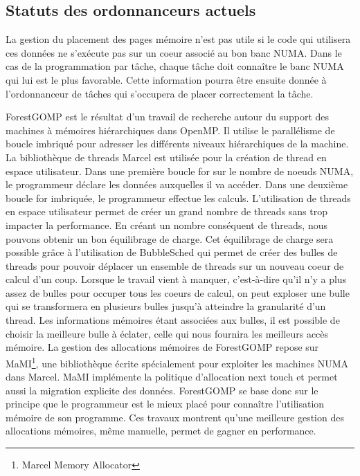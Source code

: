 \subsection{Statuts des ordonnanceurs actuels}
La gestion du placement des pages mémoire n'est pas utile si le code qui utilisera ces données ne s'exécute pas sur un coeur associé au bon banc NUMA.
%
Dans le cas de la programmation par tâche, chaque tâche doit connaître le banc NUMA qui lui est le plus favorable.
%
Cette information pourra être ensuite donnée à l'ordonnanceur de tâches qui s'occupera de placer correctement la tâche.


ForestGOMP\cite{Bro10Thesis} est le résultat d'un travail de recherche autour du support des machines à mémoires hiérarchiques dans OpenMP.
%
Il utilise le parallélisme de boucle imbriqué pour adresser les différents niveaux hiérarchiques de la machine.
%
La bibliothèque de threads Marcel\cite{marcel} est utilisée pour la création de thread en espace utilisateur.
%
Dans une première boucle for sur le nombre de noeuds NUMA, le programmeur déclare les données auxquelles il va accéder.
%
Dans une deuxième boucle for imbriquée, le programmeur effectue les calculs.
%
L'utilisation de threads en espace utilisateur permet de créer un grand nombre de threads sans trop impacter la performance.
%
En créant un nombre conséquent de threads, nous pouvons obtenir un bon équilibrage de charge.
%
Cet équilibrage de charge sera possible grâce à l'utilisation de BubbleSched\cite{bubblesched} qui permet de créer des bulles de threads pour pouvoir déplacer un ensemble de threads sur un nouveau coeur de calcul d'un coup.
%
Lorsque le travail vient à manquer, c'est-à-dire qu'il n'y a plus assez de bulles pour occuper tous les coeurs de calcul, on peut exploser une bulle qui se transformera en plusieurs bulles jusqu'à atteindre la granularité d'un thread.
%
Les informations mémoires étant associées aux bulles, il est possible de choisir la meilleure bulle à éclater, celle qui nous fournira les meilleurs accès mémoire.
%
La gestion des allocations mémoires de ForestGOMP repose sur MaMI\footnote{Marcel Memory Allocator}, une bibliothèque écrite spécialement pour exploiter les machines NUMA dans Marcel.
%
MaMI implémente la politique d'allocation next touch et permet aussi la migration explicite des données.
%
ForestGOMP se base donc sur le principe que le programmeur est le mieux placé pour connaître l'utilisation mémoire de son programme.
%
Ces travaux montrent qu'une meilleure gestion des allocations mémoires, même manuelle, permet de gagner en performance.


